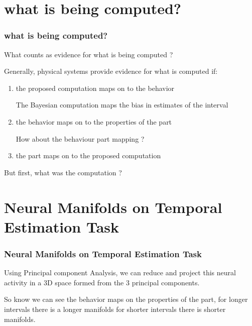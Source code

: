 \documentclass{beamer}
\begin{document}
\section{what is being computed?}
\begin{frame}
\frametitle{\textbf{what is being computed?} }
What counts as evidence for what is being computed ?

Generally, physical systems provide evidence for what is computed if:

\begin{enumerate}
    \item the proposed computation maps on to the behavior
    
    The Bayesian computation maps the bias in estimates of the interval

    \item the behavior maps on to the properties of the part
    
    How about the behaviour part mapping ?

    \item the part maps on to the proposed computation
\end{enumerate}

But first, what was the computation ?


\end{frame}


\section{Neural Manifolds on Temporal Estimation Task}
\begin{frame}
\frametitle{\textbf{Neural Manifolds on Temporal Estimation Task} }


Using Principal component Analysis, we can reduce and project this neural activity in a 3D space formed from the 3 principal components.

So know we can see the behavior maps on the properties of the part, for longer intervals there is a longer manifolds for shorter intervals there is shorter manifolds.


\end{frame}
\end{document}
